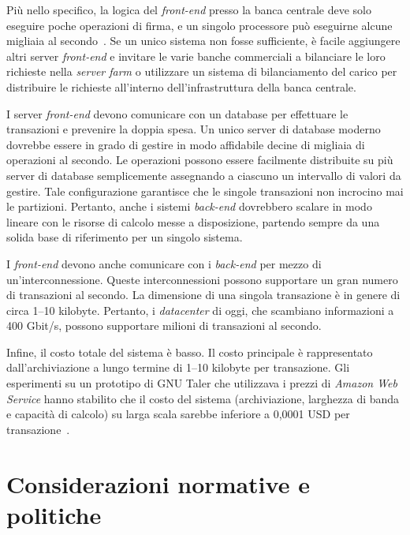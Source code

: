 \documentclass[a4paper]{article}
\begin{document}
Più nello specifico, la logica del \textit{front-end} presso la banca
centrale deve solo eseguire poche operazioni di firma, e un singolo
processore può eseguirne alcune migliaia al secondo~\cite[vedi][]{Bernstein2020}.
Se un unico sistema non fosse sufficiente, è facile aggiungere altri
server \textit{front-end} e invitare le varie banche commerciali a
bilanciare le loro richieste nella \textit{server farm} o
utilizzare un sistema di bilanciamento del carico per distribuire le
richieste all'interno dell'infrastruttura della banca centrale.

I server \textit{front-end} devono comunicare con un database per
effettuare le transazioni e prevenire la doppia spesa. Un unico server
di database moderno dovrebbe essere in grado di gestire in modo
affidabile decine di migliaia di operazioni al secondo. Le operazioni
possono essere facilmente distribuite su più server di database
semplicemente assegnando a ciascuno un intervallo di valori da
gestire. Tale configurazione garantisce che le singole transazioni non
incrocino mai le partizioni. Pertanto, anche i sistemi \textit{back-end}
dovrebbero scalare in modo lineare con le risorse di calcolo messe a
disposizione, partendo sempre da una solida base di riferimento per un
singolo sistema.

I \textit{front-end} devono anche comunicare con i \textit{back-end} per
mezzo di un'interconnessione. Queste interconnessioni possono
supportare un gran numero di transazioni al secondo. La dimensione di
una singola transazione è in genere di circa 1–10 kilobyte. Pertanto,
i \textit{datacenter} di oggi, che scambiano informazioni a 400 Gbit/s,
possono supportare milioni di transazioni al secondo.

%

Infine, il costo totale del sistema è basso. Il costo principale è
rappresentato dall'archiviazione a lungo termine di 1–10 kilobyte
per transazione. Gli esperimenti su un prototipo di GNU Taler che
utilizzava i prezzi di \textit{Amazon Web Service} hanno stabilito
che il costo del sistema (archiviazione, larghezza di banda e capacità
di calcolo) su larga scala sarebbe inferiore a 0,0001 USD per
transazione~\cite[per i dettagli sui dati, si veda][]{Dold}.

\section{Considerazioni normative e politiche}
    \label{5.-considerazioni-normative-e-politiche}
\end{document}
